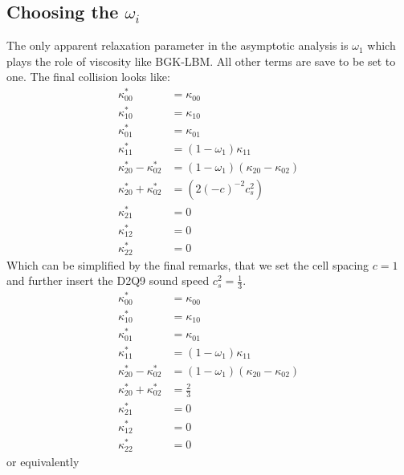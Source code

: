 \documentclass{article}
\begin{document}
\subsection{Choosing the \texorpdfstring{$\omega_i$}{omegai}}
\label{sub:Choosing the omega_i}
The only apparent relaxation parameter in the asymptotic analysis is $\omega_1$ which plays the role of viscosity like BGK-LBM.\@
All other terms are save to be set to one.
The final collision looks like:
\begin{equation}
  \begin{aligned}
    \kappa_{00}^{*} & = \kappa_{00} \\
    \kappa_{10}^{*} & = \kappa_{10} \\
    \kappa_{01}^{*} & = \kappa_{01} \\
    \kappa_{11}^{*} & = (1-\omega_1)\kappa_{11} \\
    \kappa_{20}^{*} - \kappa_{02}^{*}
      & = (1-\omega_1) (\kappa_{20} - \kappa_{02}) \\
    \kappa_{20}^{*} + \kappa_{02}^{*}
      & = \left( 2 {(-c)}^{-2} c_s^2 \right) \\
    \kappa_{21}^{*} & = 0 \\
    \kappa_{12}^{*} & = 0 \\
    \kappa_{22}^{*} & = 0
  \end{aligned}
\end{equation}
Which can be simplified by the final remarks, that we set the cell spacing $c=1$ and further insert the D2Q9 sound speed $c_s^2=\frac{1}{3}$.
\begin{equation}
  \begin{aligned}
    \kappa_{00}^{*} & = \kappa_{00} \\
    \kappa_{10}^{*} & = \kappa_{10} \\
    \kappa_{01}^{*} & = \kappa_{01} \\
    \kappa_{11}^{*} & = (1-\omega_1)\kappa_{11} \\
    \kappa_{20}^{*} - \kappa_{02}^{*}
      & = (1-\omega_1) (\kappa_{20} - \kappa_{02}) \\
    \kappa_{20}^{*} + \kappa_{02}^{*}
      & =  \frac{2}{3} \\
    \kappa_{21}^{*} & = 0 \\
    \kappa_{12}^{*} & = 0 \\
    \kappa_{22}^{*} & = 0
  \end{aligned}
\end{equation}
or equivalently
\end{document}
